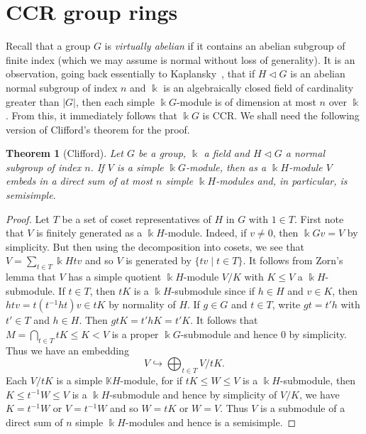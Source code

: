 \documentclass[11pt,reqno]{amsart}
\newtheorem{thm}{Theorem}[section]
\theoremstyle{plain}
\numberwithin{equation}{section}
\begin{document}
\section{CCR group rings} \label{sec:CCRgrouprings}
Recall that a group $G$ is \emph{virtually abelian} if it contains an abelian subgroup of finite index (which we may assume is normal without loss of generality).
It is an observation, going back essentially to Kaplansky~\cite{K49}, that if $H\lhd G$ is an abelian normal subgroup of index $n$ and $\Bbbk$ is an algebraically closed field of cardinality greater than $|G|$, then each simple $\Bbbk G$-module is of dimension at most $n$ over $\Bbbk$.  From this, it immediately follows that $\Bbbk G$ is CCR.  We shall need the following version of Clifford's theorem for the proof.



\begin{thm}[Clifford]\label{t:clifford}
Let $G$ be a group, $\Bbbk$ a field and $H\lhd G$ a normal subgroup of index $n$.    If $V$ is a simple $\Bbbk G$-module, then as a $\Bbbk H$-module $V$ embeds in a direct sum  of at most $n$ simple $\Bbbk H$-modules and, in particular, is semisimple.
\end{thm}
\begin{proof}
Let $T$ be a set of coset representatives of $H$ in $G$ with $1\in T$.  First note that $V$ is finitely generated as a $\Bbbk H$-module.  Indeed, if $v\neq 0$, then $\Bbbk Gv=V$ by simplicity.  But then using the decomposition into cosets, we see that $V= \sum_{t\in T}\Bbbk Htv$ and so $V$ is generated by $\{tv\mid t\in T\}$.  It follows from Zorn's lemma that $V$ has a simple quotient $\Bbbk H$-module $V/K$ with $K\leq V$ a $\Bbbk H$-submodule.  If $t\in T$, then  $tK$ is a $\Bbbk H$-submodule since if $h\in H$ and $v\in K$, then $htv = t(t^{-1}ht)v\in tK$ by normality of $H$.    If $g\in G$ and $t\in T$, write $gt=t'h$ with $t'\in T$ and $h\in H$.  Then $gtK = t'hK=t'K$. It follows that $M=\bigcap_{t\in T}tK\leq K<V$ is a proper $\Bbbk G$-submodule and hence $0$ by simplicity.  Thus we have an embedding
\[V\hookrightarrow \bigoplus_{t\in T} V/tK.\]  Each $V/tK$ is a simple $\mathbb KH$-module, for if $tK\leq W\leq V$ is a $\Bbbk H$-submodule, then $K\leq t^{-1}W\leq V$ is a $\Bbbk H$-submodule and hence by simplicity of $V/K$, we have $K=t^{-1}W$ or $V=t^{-1}W$ and so $W=tK$ or $W=V$.   Thus $V$ is a submodule of a direct sum of $n$ simple $\Bbbk H$-modules and hence is a semisimple.
\end{proof}
\end{document}
